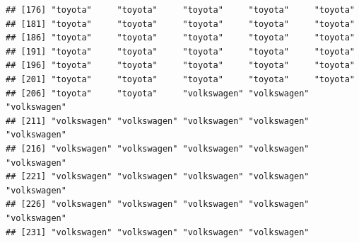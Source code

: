 \documentclass[
]{article}
\newenvironment{Shaded}{\begin{snugshade}}{\end{snugshade}}
\newcommand{\NormalTok}[1]{#1}
\newcommand{\SpecialCharTok}[1]{\textcolor[rgb]{0.00,0.00,0.00}{#1}}
\begin{document}
\begin{verbatim}
## [176] "toyota"     "toyota"     "toyota"     "toyota"     "toyota"    
## [181] "toyota"     "toyota"     "toyota"     "toyota"     "toyota"    
## [186] "toyota"     "toyota"     "toyota"     "toyota"     "toyota"    
## [191] "toyota"     "toyota"     "toyota"     "toyota"     "toyota"    
## [196] "toyota"     "toyota"     "toyota"     "toyota"     "toyota"    
## [201] "toyota"     "toyota"     "toyota"     "toyota"     "toyota"    
## [206] "toyota"     "toyota"     "volkswagen" "volkswagen" "volkswagen"
## [211] "volkswagen" "volkswagen" "volkswagen" "volkswagen" "volkswagen"
## [216] "volkswagen" "volkswagen" "volkswagen" "volkswagen" "volkswagen"
## [221] "volkswagen" "volkswagen" "volkswagen" "volkswagen" "volkswagen"
## [226] "volkswagen" "volkswagen" "volkswagen" "volkswagen" "volkswagen"
## [231] "volkswagen" "volkswagen" "volkswagen" "volkswagen"
\end{verbatim}

\begin{Shaded}
\end{Shaded}
\end{document}
